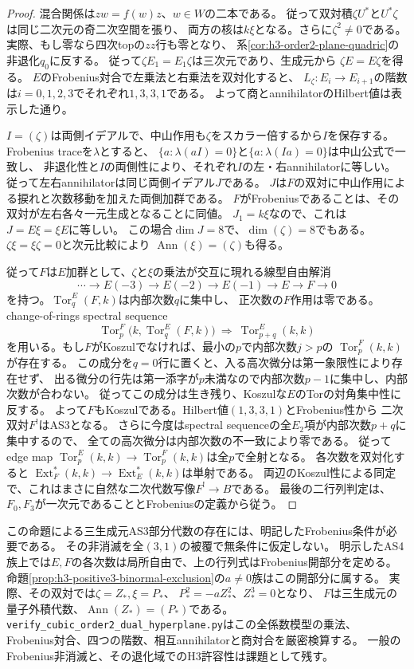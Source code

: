 \begin{proof}
混合関係は$zw=f(w)z$、$w\in W$の二本である。
従って双対積$\zeta U^*$と$U^*\zeta$は同じ二次元の奇二次空間を張り、
両方の核は$k\xi$となる。さらに$\zeta^2\ne0$である。
実際、もし零なら四次topの$zz$行も零となり、
系\ref{cor:h3-order2-plane-quadric}の非退化$q_0$に反する。
従って$\zeta E_1=E_1\zeta$は三次元であり、生成元から
$\zeta E=E\zeta$を得る。
$E$のFrobenius対合で左乗法と右乗法を双対化すると、
$L_\zeta:E_i\to E_{i+1}$の階数は$i=0,1,2,3$でそれぞれ$1,3,3,1$である。
よって商とannihilatorのHilbert値は表示した通り。

$I=(\zeta)$は両側イデアルで、中山作用も$\zeta$をスカラー倍するから$I$を保存する。
Frobenius traceを$\lambda$とすると、
$\{a:\lambda(aI)=0\}$と$\{a:\lambda(Ia)=0\}$は中山公式で一致し、
非退化性と$I$の両側性により、それぞれ$I$の左・右annihilatorに等しい。
従って左右annihilatorは同じ両側イデアル$J$である。
$J$は$F$の双対に中山作用による捩れと次数移動を加えた両側加群である。
$F$がFrobeniusであることは、その双対が左右各々一元生成となることに同値。
$J_1=k\xi$なので、これは$J=E\xi=\xi E$に等しい。
この場合$\dim J=8$で、$\dim(\zeta)=8$でもある。
$\zeta\xi=\xi\zeta=0$と次元比較により
$\operatorname{Ann}(\xi)=(\zeta)$も得る。

従って$F$は$E$加群として、$\zeta$と$\xi$の乗法が交互に現れる線型自由解消
\[
 \cdots\longrightarrow E(-3)\longrightarrow E(-2)
 \longrightarrow E(-1)\longrightarrow E\longrightarrow F\longrightarrow0
\]
を持つ。$\operatorname{Tor}^E_q(F,k)$は内部次数$q$に集中し、
正次数の$F$作用は零である。
change-of-rings spectral sequence
\[
 \operatorname{Tor}^F_p\bigl(k,\operatorname{Tor}^E_q(F,k)\bigr)
 \ \Longrightarrow\ \operatorname{Tor}^E_{p+q}(k,k)
\]
を用いる。もし$F$がKoszulでなければ、最小の$p$で内部次数$j>p$の
$\operatorname{Tor}^F_p(k,k)$が存在する。
この成分を$q=0$行に置くと、入る高次微分は第一象限性により存在せず、
出る微分の行先は第一添字が$p$未満なので内部次数$p-1$に集中し、内部次数が合わない。
従ってこの成分は生き残り、Koszulな$E$のTorの対角集中性に反する。
よって$F$もKoszulである。Hilbert値$(1,3,3,1)$とFrobenius性から
二次双対$F^!$はAS3となる。
さらに今度はspectral sequenceの全$E_2$項が内部次数$p+q$に集中するので、
全ての高次微分は内部次数の不一致により零である。
従ってedge map
$\operatorname{Tor}^E_p(k,k)\to\operatorname{Tor}^F_p(k,k)$は全$p$で全射となる。
各次数を双対化すると
$\operatorname{Ext}^*_F(k,k)\to\operatorname{Ext}^*_E(k,k)$は単射である。
両辺のKoszul性による同定で、これはまさに自然な二次代数写像$F^!\to B$である。
最後の二行列判定は、$F_0,F_3$が一次元であることとFrobeniusの定義から従う。
\end{proof}

この命題による三生成元AS3部分代数の存在には、明記したFrobenius条件が必要である。
その非消滅を全$(3,1)$の被覆で無条件に仮定しない。
明示したAS4族上では$E,F$の各次数は局所自由で、上の行列式はFrobenius開部分を定める。
命題\ref{prop:h3-positive3-binormal-exclusion}の$a\ne0$族はこの開部分に属する。
実際、その双対では$\zeta=Z_*,\xi=P_*$、
$P_*^2=-aZ_*^2$、$Z_*^3=0$となり、
$F$は三生成元の量子外積代数、$\operatorname{Ann}(Z_*)=(P_*)$である。
\texttt{verify\_cubic\_order2\_dual\_hyperplane.py}はこの全係数模型の乗法、
Frobenius対合、四つの階数、相互annihilatorと商対合を厳密検算する。
一般のFrobenius非消滅と、その退化域でのH3許容性は課題として残す。
